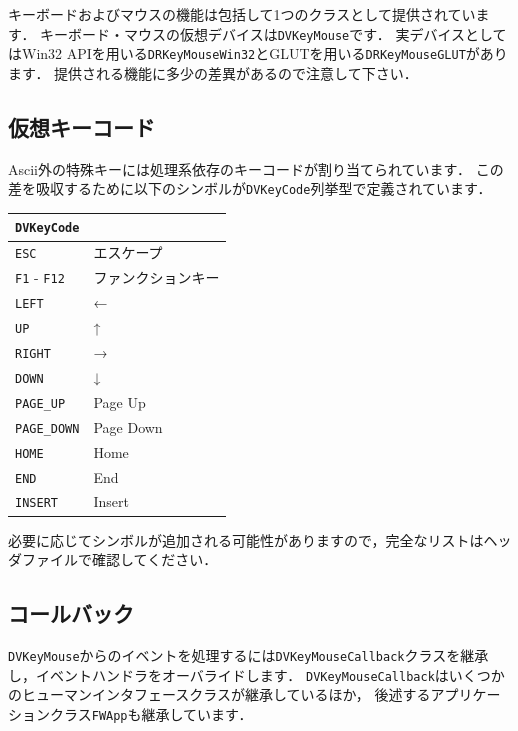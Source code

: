 \KLUDGE キーボードおよびマウスの機能は包括して1\KLUDGE つのクラスとして提供されています．
\KLUDGE キーボード・マウスの仮想デバイスは\texttt{DVKeyMouse}\KLUDGE です．
\KLUDGE 実デバイスとしてはWin32 API\KLUDGE を用いる\texttt{DRKeyMouseWin32}\KLUDGE とGLUT\KLUDGE を用いる\texttt{DRKeyMouseGLUT}\KLUDGE があります．
\KLUDGE 提供される機能に多少の差異があるので注意して下さい．

\subsection*{\KLUDGE 仮想キーコード}

Ascii\KLUDGE 外の特殊キーには処理系依存のキーコードが割り当てられています．
\KLUDGE この差を吸収するために以下のシンボルが\texttt{DVKeyCode}\KLUDGE 列挙型で定義されています．

\begin{center}
\begin{tabular}{p{.3\hsize}p{.6\hsize}}
\texttt{DVKeyCode}									\\ \midrule
\texttt{ESC}				& \KLUDGE エスケープ			\\
\texttt{F1} - \texttt{F12}	& \KLUDGE ファンクションキー	\\
\texttt{LEFT}				& \KLUDGE ←					\\
\texttt{UP}					& \KLUDGE ↑					\\
\texttt{RIGHT}				& \KLUDGE →					\\
\texttt{DOWN}				& \KLUDGE ↓					\\
\texttt{PAGE\_UP}			& Page Up				\\
\texttt{PAGE\_DOWN}			& Page Down				\\
\texttt{HOME}				& Home					\\
\texttt{END}				& End					\\
\texttt{INSERT}				& Insert				\\
\end{tabular}
\end{center}

\KLUDGE 必要に応じてシンボルが追加される可能性がありますので，完全なリストはヘッダファイルで確認してください．

\subsection*{\KLUDGE コールバック}

\texttt{DVKeyMouse}\KLUDGE からのイベントを処理するには\texttt{DVKeyMouseCallback}\KLUDGE クラスを継承し，イベントハンドラをオーバライドします．
\texttt{DVKeyMouseCallback}\KLUDGE はいくつかのヒューマンインタフェースクラスが継承しているほか，
\KLUDGE 後述するアプリケーションクラス\texttt{FWApp}\KLUDGE も継承しています．

